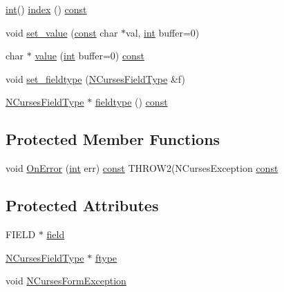 \begin{DoxyCompactItemize}
\item 
\hyperlink{term__entry_8h_ad65b480f8c8270356b45a9890f6499ae}{int}() \hyperlink{class_n_curses_form_field_a8b468b60c02123deb019a38e00ca1553}{index} () \hyperlink{term__entry_8h_a57bd63ce7f9a353488880e3de6692d5a}{const} 
\item 
void \hyperlink{class_n_curses_form_field_aaa9132c687db16937520492c7a0d318c}{set\-\_\-value} (\hyperlink{term__entry_8h_a57bd63ce7f9a353488880e3de6692d5a}{const} char $\ast$val, \hyperlink{term__entry_8h_ad65b480f8c8270356b45a9890f6499ae}{int} buffer=0)
\item 
char $\ast$ \hyperlink{class_n_curses_form_field_a759c0ffc4ed4363923ee22088f260b7f}{value} (\hyperlink{term__entry_8h_ad65b480f8c8270356b45a9890f6499ae}{int} buffer=0) \hyperlink{term__entry_8h_a57bd63ce7f9a353488880e3de6692d5a}{const} 
\item 
void \hyperlink{class_n_curses_form_field_ab9b5a28ff460336577dc6058695f3749}{set\-\_\-fieldtype} (\hyperlink{class_n_curses_field_type}{N\-Curses\-Field\-Type} \&f)
\item 
\hyperlink{class_n_curses_field_type}{N\-Curses\-Field\-Type} $\ast$ \hyperlink{class_n_curses_form_field_ac68055ec9fa9e9ef89e945b5cc997b5a}{fieldtype} () \hyperlink{term__entry_8h_a57bd63ce7f9a353488880e3de6692d5a}{const} 
\end{DoxyCompactItemize}
\subsection*{Protected Member Functions}
\begin{DoxyCompactItemize}
\item 
void \hyperlink{class_n_curses_form_field_a748f25f342d1b4228d1bb5e0fbeb82fc}{On\-Error} (\hyperlink{term__entry_8h_ad65b480f8c8270356b45a9890f6499ae}{int} err) \hyperlink{term__entry_8h_a57bd63ce7f9a353488880e3de6692d5a}{const} T\-H\-R\-O\-W2(N\-Curses\-Exception \hyperlink{term__entry_8h_a57bd63ce7f9a353488880e3de6692d5a}{const} 
\end{DoxyCompactItemize}
\subsection*{Protected Attributes}
\begin{DoxyCompactItemize}
\item 
F\-I\-E\-L\-D $\ast$ \hyperlink{class_n_curses_form_field_a1702927c89099dd48638e80bd71e9ee0}{field}
\item 
\hyperlink{class_n_curses_field_type}{N\-Curses\-Field\-Type} $\ast$ \hyperlink{class_n_curses_form_field_a5c11bb279f5e95777335788b26828b81}{ftype}
\item 
void \hyperlink{class_n_curses_form_field_a67c74669c2cb8f4599d99ebef593d556}{N\-Curses\-Form\-Exception}
\end{DoxyCompactItemize}
